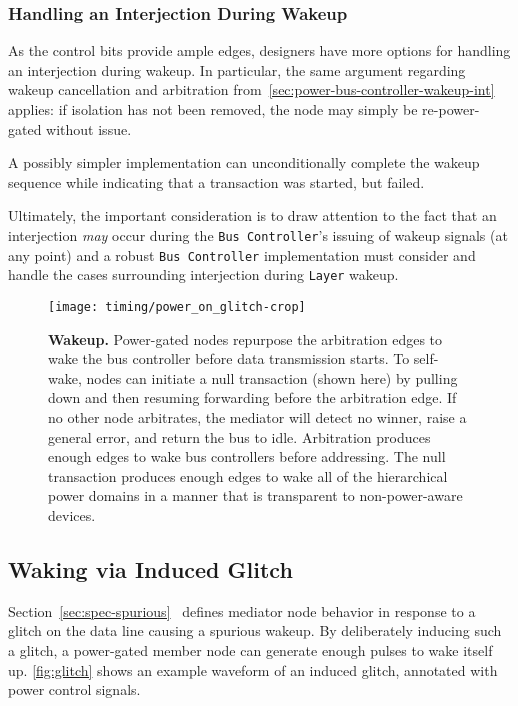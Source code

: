\subsubsection{Handling an Interjection During Wakeup}
As the control bits provide ample edges, designers have more options for
handling an interjection during wakeup. In particular, the same argument
regarding wakeup cancellation and arbitration
from~\ref{sec:power-bus-controller-wakeup-int} applies: if isolation has not
been removed, the node may simply be re-power-gated without issue.

A possibly simpler implementation can unconditionally complete the wakeup
sequence while indicating that a transaction was started, but failed.

Ultimately, the important consideration is to draw attention to the fact that
an interjection {\em may} occur during the {\tt Bus~Controller}'s issuing of
wakeup signals (at any point) and a robust {\tt Bus~Controller} implementation
must consider and handle the cases surrounding interjection during {\tt Layer}
wakeup.

\begin{figure}[t]
  \centering
  \texttt{[image: timing/power\_on\_glitch-crop]}
  \caption{\textbf{\bus Wakeup.} \textmd{
      Power-gated nodes repurpose the arbitration edges to wake the bus
      controller before data transmission starts. To self-wake, nodes can
      initiate a null transaction (shown here) by pulling down \DAT and then
      resuming forwarding \DAT before the arbitration edge. If no other node
      arbitrates, the mediator will detect no winner, raise a general error,
      and return the bus to idle.
      Arbitration produces enough edges to wake bus controllers before
      addressing. The null transaction produces enough edges to wake all of
      the \bus hierarchical power domains in a manner that is transparent to
      non-power-aware devices.
  }}
  \label{fig:glitch}
\end{figure}

\subsection{Waking via Induced Glitch}
Section~\ref{sec:spec-spurious}~ defines mediator
node behavior in response to a glitch on the data line causing a spurious
wakeup. By deliberately inducing such a glitch, a power-gated member node can
generate enough pulses to wake itself up. \autoref{fig:glitch} shows an
example waveform of an induced glitch, annotated with power control signals.

